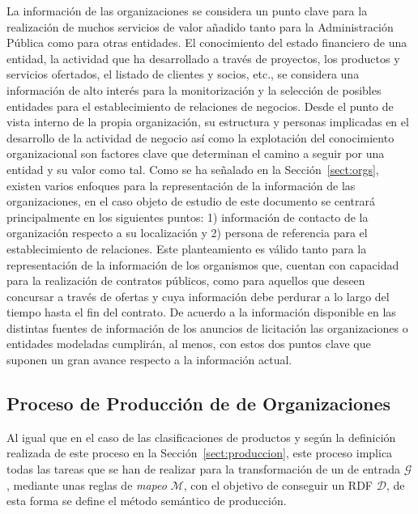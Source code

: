La información de las organizaciones se considera un punto clave para la realización 
de muchos servicios de valor añadido tanto para la Administración Pública como 
para otras entidades. El conocimiento del estado financiero de una entidad, la actividad que ha desarrollado a 
través de proyectos, los productos y servicios ofertados, el listado de clientes y socios, etc., se considera una 
información de alto interés para la monitorización y la selección de posibles entidades 
para el establecimiento de relaciones de negocios. Desde el punto de vista interno de la propia organización, su estructura y 
personas implicadas en el desarrollo de la actividad de negocio así como la explotación del conocimiento organizacional 
son factores clave que determinan el camino a seguir por una entidad y su valor como tal. Como se ha señalado 
en la Sección~\ref{sect:orgs}, existen varios enfoques para la representación de la información de las organizaciones, 
en el caso objeto de estudio de este documento se centrará principalmente en los siguientes puntos: 1) información 
de contacto de la organización respecto a su localización y 2) persona de referencia para el establecimiento de 
relaciones. Este planteamiento es válido tanto para la representación de la información de los organismos que, cuentan con capacidad 
para la realización de contratos públicos, como para aquellos que deseen concursar a través de ofertas y cuya información 
debe perdurar a lo largo del tiempo hasta el fin del contrato. De acuerdo a la información disponible en las distintas 
fuentes de información de los anuncios de licitación las organizaciones o entidades modeladas cumplirán, al menos, con estos 
dos puntos clave que suponen un gran avance respecto a la información actual.

\subsection{Proceso de Producción de \linkeddata de Organizaciones}
Al igual que en el caso de las clasificaciones de productos y según la definición realizada 
de este proceso en la Sección~\ref{sect:produccion}, este proceso implica todas las tareas 
que se han de realizar para la transformación de un \dataset de entrada $\mathcal{G}$, mediante 
unas reglas de \textit{mapeo} $\mathcal{M}$, con el objetivo de conseguir un \dataset \gls{RDF} $\mathcal{D}$, de esta forma 
se define el método semántico de producción. 

